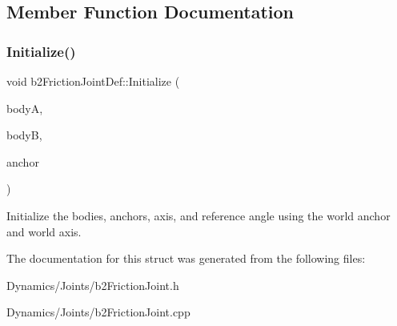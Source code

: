 \subsection{Member Function Documentation}
\mbox{\label{structb2FrictionJointDef_aee104f2aeb34dec4e17e3c52a98f7915}} 
\subsubsection{\texorpdfstring{Initialize()}{Initialize()}}
{\footnotesize\ttfamily void b2\+Friction\+Joint\+Def\+::\+Initialize (\begin{DoxyParamCaption}\item[{\mbox{\hyperlink{classb2Body}{b2\+Body}} $\ast$}]{bodyA,  }\item[{\mbox{\hyperlink{classb2Body}{b2\+Body}} $\ast$}]{bodyB,  }\item[{const \mbox{\hyperlink{structb2Vec2}{b2\+Vec2}} \&}]{anchor }\end{DoxyParamCaption})}

Initialize the bodies, anchors, axis, and reference angle using the world anchor and world axis. 

The documentation for this struct was generated from the following files\+:\begin{DoxyCompactItemize}
\item 
Dynamics/\+Joints/b2\+Friction\+Joint.\+h\item 
Dynamics/\+Joints/b2\+Friction\+Joint.\+cpp\end{DoxyCompactItemize}
